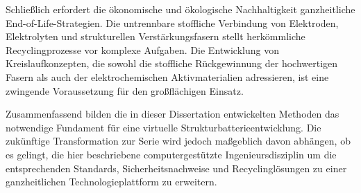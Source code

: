 Schließlich erfordert die ökonomische und ökologische Nachhaltigkeit ganzheitliche End-of-Life-Strategien. Die untrennbare stoffliche Verbindung von Elektroden, Elektrolyten und strukturellen Verstärkungsfasern stellt herkömmliche Recyclingprozesse vor komplexe Aufgaben. Die Entwicklung von Kreislaufkonzepten, die sowohl die stoffliche Rückgewinnung der hochwertigen Fasern als auch der elektrochemischen Aktivmaterialien adressieren, ist eine zwingende Voraussetzung für den großflächigen Einsatz.

Zusammenfassend bilden die in dieser Dissertation entwickelten Methoden das notwendige Fundament für eine virtuelle Strukturbatterieentwicklung. Die zukünftige Transformation zur Serie wird jedoch maßgeblich davon abhängen, ob es gelingt, die hier beschriebene computergestützte Ingenieursdisziplin um die entsprechenden Standards, Sicherheitsnachweise und Recyclinglösungen zu einer ganzheitlichen Technologieplattform zu erweitern.
